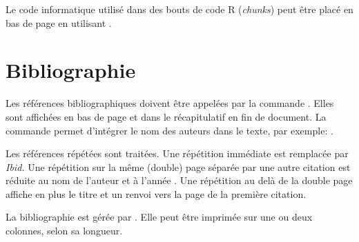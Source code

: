 \documentclass[
  a4paper, %
  11pt, extrafontsizes, %
  onecolumn, %
  openright, %
]{memoir}
\begin{document}
Le code informatique utilisé dans des bouts de code R (\foreignlanguage{english}{\emph{chunks}}) peut être placé en bas de page en utilisant  
.


\section{Bibliographie}

Les références bibliographiques doivent être appelées par la commande . 
Elles sont affichées en bas de page \autocite{Rao1985} et dans le récapitulatif en fin de document.
La commande  permet d'intégrer le nom des auteurs dans le texte, par exemple: \textcite{Rao1985}.

Les références répétées \autocite{Pelissier2001} sont traitées.
Une répétition immédiate est remplacée par \emph{Ibid.} \autocite{Pelissier2001}
Une répétition sur la même (double) page séparée par une autre citation \autocite{Rao1985} est réduite au nom de l'auteur et à l'année \autocite{Pelissier2001}.
Une répétition au delà de la double page affiche en plus le titre et un renvoi vers la page de la première citation.

La bibliographie est gérée par .
Elle peut être imprimée sur une ou deux colonnes, selon sa longueur.



\backmatter
\clearpage


\SmallMargins


\printbibliography
\end{document}

